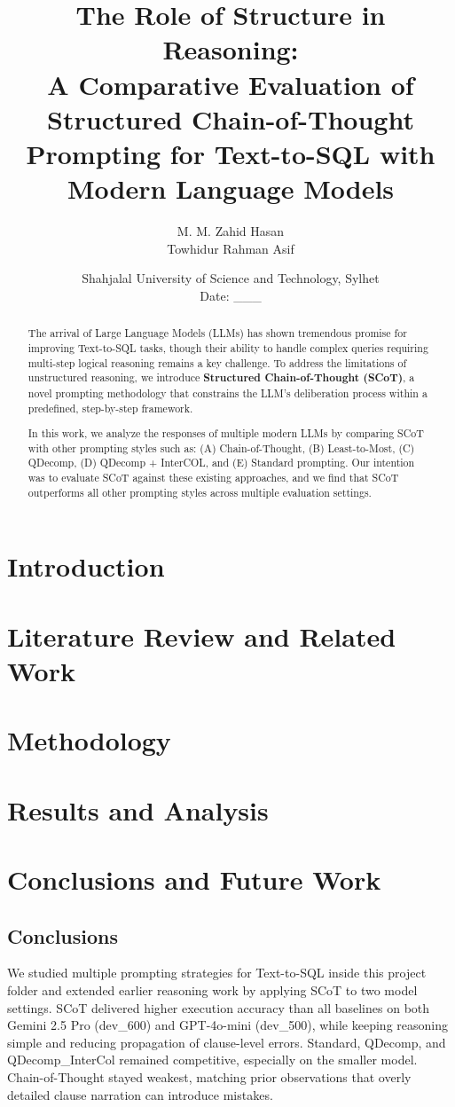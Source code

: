 \documentclass[12pt,a4paper]{report}
\title{\textbf{The Role of Structure in Reasoning:}\\\textbf{A Comparative Evaluation of Structured Chain-of-Thought Prompting for Text-to-SQL with Modern Language Models}}
\author{M. M. Zahid Hasan \\ Towhidur Rahman Asif}
\date{Shahjalal University of Science and Technology, Sylhet\\[6pt]Date: ___}
\begin{document}
\maketitle
{}\setcounter{page}{2}
\begin{abstract}
The arrival of Large Language Models (LLMs) has shown tremendous promise for improving Text-to-SQL tasks, though their ability to handle complex queries requiring multi-step logical reasoning remains a key challenge. To address the limitations of unstructured reasoning, we introduce \textbf{Structured Chain-of-Thought (SCoT)}, a novel prompting methodology that constrains the LLM's deliberation process within a predefined, step-by-step framework.

In this work, we analyze the responses of multiple modern LLMs by comparing SCoT with other prompting styles such as: (A) Chain-of-Thought, (B) Least-to-Most, (C) QDecomp, (D) QDecomp + InterCOL, and (E) Standard prompting. Our intention was to evaluate SCoT against these existing approaches, and we find that SCoT outperforms all other prompting styles across multiple evaluation settings.
\end{abstract}
\newpage{}
\chapter{Introduction}
\chapter{Literature Review and Related Work}
\chapter{Methodology}
\chapter{Results and Analysis}
\chapter{Conclusions and Future Work}
\section{Conclusions}
We studied multiple prompting strategies for Text-to-SQL inside this project folder and extended earlier reasoning work by applying SCoT to two model settings. SCoT delivered higher execution accuracy than all baselines on both Gemini 2.5 Pro (dev_600) and GPT-4o-mini (dev_500), while keeping reasoning simple and reducing propagation of clause-level errors. Standard, QDecomp, and QDecomp_InterCol remained competitive, especially on the smaller model. Chain-of-Thought stayed weakest, matching prior observations that overly detailed clause narration can introduce mistakes.
\end{document}
